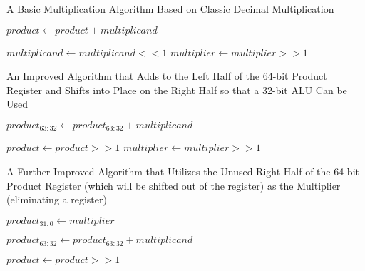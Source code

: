 \documentclass[11pt]{article}
\begin{document}
\begin{algorithm}[hbt!]
\caption{A Basic Multiplication Algorithm Based on Classic Decimal Multiplication}\label{alg:mul1}
\begin{algorithmic}

        \State $product \gets product + multiplicand$    
    \EndIf
    
    \State $multiplicand \gets multiplicand << 1$
    \State $multiplier \gets multiplier >> 1$
\EndFor 

\end{algorithmic}
\end{algorithm}

\pagebreak

\begin{algorithm}[hbt!]
\caption{An Improved Algorithm that Adds to the Left Half of the 64-bit Product Register and Shifts into Place on the Right Half so that a 32-bit ALU Can be Used}\label{alg:mul2}
\begin{algorithmic}

        \State $product_{63:32} \gets product_{63:32} + multiplicand$    
    \EndIf
    
    \State $product \gets product >> 1$
    \State $multiplier \gets multiplier >> 1$
\EndFor 

\end{algorithmic}
\end{algorithm}

\pagebreak

\begin{algorithm}[hbt!]
\caption{A Further Improved Algorithm that Utilizes the Unused Right Half of the 64-bit Product Register (which will be shifted out of the register) as the Multiplier (eliminating a register)}\label{alg:mul3}
\begin{algorithmic}

\State $product_{31:0} \gets multiplier$

        \State $product_{63:32} \gets product_{63:32} + multiplicand$    
    \EndIf
    
    \State $product \gets product >> 1$
\EndFor 

\end{algorithmic}
\end{algorithm}

\pagebreak
\end{document}
